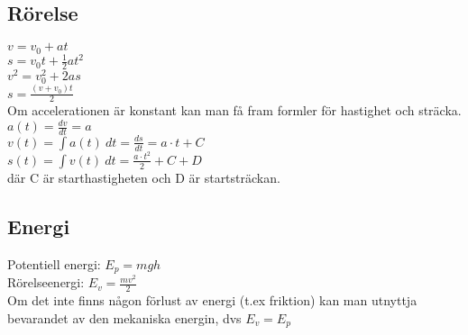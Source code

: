 \subsection{Rörelse}
    \begin{math}
        v = v_0 + at
    \end{math} \\[2pt]
    \begin{math}
        s = v_0 t + \frac{1}{2} at^2
    \end{math} \\[2pt]
    \begin{math}
        v^2 = v_0^2 + 2as
    \end{math} \\[2pt]
    \begin{math}
        s = \frac{(v + v_0)t}{2}
    \end{math} \\[2pt]
    Om accelerationen är konstant kan man få fram formler för hastighet och sträcka. \\
    \begin{math}
        a(t) = \frac{dv}{dt} = a
    \end{math} \\[2pt]
    \begin{math}
        v(t) = \int a(t) \ dt = \frac{ds}{dt} = a \cdot t + C
    \end{math} \\[2pt]
    \begin{math}
        s(t) = \int v(t) \ dt = \frac{a \cdot t^2}{2} + C + D
    \end{math} \\[2pt]
    där C är starthastigheten och D är startsträckan.

\subsection{Energi}
Potentiell energi:
\begin{math}
    E_p = mgh
\end{math} \\[2pt]
Rörelseenergi:
\begin{math}
    E_v = \frac{mv^2}{2}
\end{math} \\[2pt]
Om det inte finns någon förlust av energi (t.ex friktion) kan man utnyttja bevarandet av den mekaniska energin, dvs 
\begin{math}
    E_v = E_p
\end{math} \\[2pt]

